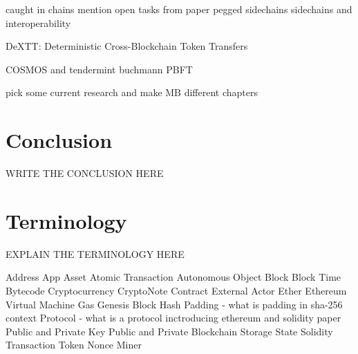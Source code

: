 caught in chains mention open tasks from paper \cite{borkowski2018caught}
pegged sidechains \cite{back2014enabling}
sidechains and interoperability \cite{johnson2019sidechains}

DeXTT: Deterministic Cross-Blockchain Token Transfers \cite{borkowski2019dextt}

COSMOS \cite{kwon2018network} and tendermint \cite{kwon2014tendermint} buchmann \cite{buchman2016tendermint} PBFT \cite{castro1999practical}

pick some current research and make MB different chapters

\chapter{Conclusion}
\label{ch:chapter07}
WRITE THE CONCLUSION HERE

\chapter{Terminology}
\label{ch:chapter08}
EXPLAIN THE TERMINOLOGY HERE

Address
App
Asset
Atomic Transaction
Autonomous Object
Block
Block Time
Bytecode
Cryptocurrency
CryptoNote
Contract 
External Actor
Ether
Ethereum Virtual Machine
Gas
Genesis Block
Hash
Padding - what is padding in sha-256 context
Protocol - what is a protocol inctroducing ethereum and solidity paper
Public and Private Key
Public and Private Blockchain
Storage State
Solidity
Transaction 
Token
Nonce
Miner







